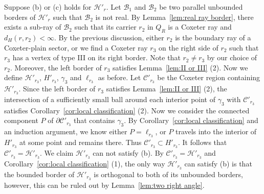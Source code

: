\documentclass[11pt]{amsart}
\newcommand {\B}{\mathcal B}
\newcommand {\C}{\mathcal C}
\newcommand {\h}{\mathcal H}
\theoremstyle{definition}
\begin{document}
Suppose (b) or (c) holds for $\h'_r$. Let $\B_1$ and $\B_2$ be two parallel unbounded borders of $\h'_r$ such that $\B_2$ is not real. By Lemma~\ref{lem:real ray border}, there exists a sub-ray of $\B_2$ such that its carrier $r_2$ in $Q_R$ is a Coxeter ray and $d_H(r,r_2)<\infty$. By the previous discussion, either $r_2$ is the boundary ray of a Coxeter-plain sector, or we find a Coxeter ray $r_3$ on the right side of $r_2$ such that $r_3$ has a vertex of type III on its right border. Note that $r_2\neq r_3$ by our choice of $r_2$. Moreover, the left border of $r_3$ satisfies Lemma~\ref{lem:II or III} (2). Now we define $\h'_{r_3}$, $H'_{r_3}$, $\gamma_3$ and $\ell_{r_3}$ as before. Let $\C'_{r_3}$ be the Coxeter region containing $\h'_{r_3}$. Since the left border of $r_3$ satisfies Lemma~\ref{lem:II or III} (2), the intersection of a sufficiently small ball around each interior point of $\gamma_3$ with $\C'_{r_3}$ satisfies Corollary~\ref{cor:local classification} (2). Now we consider the connected component $P$ of $\partial \C'_{r_3}$ that contains $\gamma_3$. By Corollary~\ref{cor:local classification} and an induction argument, we know either $P=\ell_{r_3}$, or $P$ travels into the interior of $H'_{r_3}$ at some point and remains there. Thus $\C'_{r_3}\subset H'_{r_3}$. It follows that $\C'_{r_3}=\h'_{r_3}$. We claim $\h'_{r_3}$ can not satisfy (b). By $\C'_{r_3}=\h'_{r_3}$ and Corollary~\ref{cor:local classification} (1), the only way $\h'_{r_3}$ can satisfy (b) is that the bounded border of $\h'_{r_3}$ is orthogonal to both of its unbounded borders, however, this can be ruled out by Lemma~\ref{lem:two right angle}.
\end{document}

